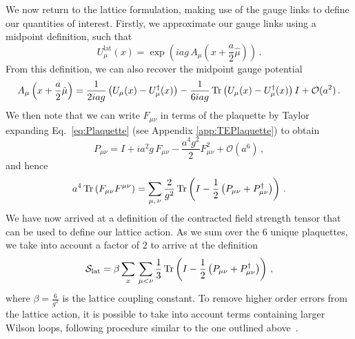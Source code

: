 We now return to the lattice formulation, making use of the gauge links to define our quantities of interest. Firstly, we approximate our gauge links using a midpoint definition, such that
\begin{equation}
U_\mu^\text{lat}(x) = \exp\left(iag\, A_\mu\left(x+\frac{a}{2}\hat{\mu}\right)\right)\, .
\label{eq:GaugeLinkLat}
\end{equation}
From this definition, we can also recover the midpoint gauge potential~\cite{Leinweber:1998im,Alles:1996ka}
\begin{equation}
A_\mu\left(x+\frac{a}{2}\hat{\mu}\right) = \frac{1}{2iag}\left(U_\mu(x) - U_\mu^\dag(x)\right) - \frac{1}{6iag}\operatorname{Tr}\left(U_\mu(x) - U_\mu^\dag(x)\right)I + \mathcal{O}(a^2)\, .
\label{eq:GaugePotentialLat}
\end{equation}
We then note that we can write $F_{\mu\nu}$ in terms of the plaquette by Taylor expanding Eq.~\ref{eq:Plaquette} (see Appendix \ref{app:TEPlaquette}) to obtain~\cite{Gupta:1997nd}
%
\begin{equation}
P_{\mu\nu} = I+ia^2g\, F_{\mu\nu} - \frac{a^4 g^2}{2}F^2_{\mu\nu} +\mathcal{O}(a^6)\, ,
\end{equation} 
%
and hence
%
\begin{align}
a^4\operatorname{Tr}\left(F_{\mu\nu}F^{\mu\nu}\right) = \sum_{\mu,\,\nu}\frac{2}{g^2}\operatorname{Tr}\left(I-\frac{1}{2}\left(P_{\mu\nu}+P_{\mu\nu}^\dag\right)\right)\, .
\end{align}
%
We have now arrived at a definition of the contracted field strength tensor that can be used to define our lattice action. As we sum over the 6 unique plaquettes, we take into account a factor of $2$ to arrive at the definition 
%
\begin{equation}
\mathcal{S}_\text{lat} = \beta\sum_x\,\sum_{\mu<\nu} \frac{1}{3}\operatorname{Tr}\left(I-\frac{1}{2}\left(P_{\mu\nu}+P_{\mu\nu}^\dag\right)\right)\, ,
\label{eq:WilsonAction}
\end{equation}
%
where $\beta = \frac{6}{g^2}$ is the lattice coupling constant. To remove higher order errors from the lattice action, it is possible to take into account terms containing larger Wilson loops, following procedure similar to the one outlined above~\cite{Alford:1995hw,Symanzik:1983dc,Symanzik:1983gh}.\\

